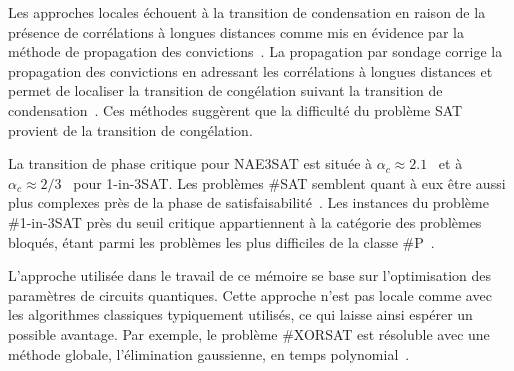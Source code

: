 Les approches locales échouent à la transition de condensation en raison de la présence de corrélations à longues distances comme mis en évidence par la méthode de propagation des convictions~\cite{mezardInformationPhysicsComputation2009}. La propagation par sondage corrige la propagation des convictions en adressant les corrélations à longues distances et permet de localiser la transition de congélation suivant la transition de condensation~\cite{mezardInformationPhysicsComputation2009}. Ces méthodes suggèrent que la difficulté du problème SAT provient de la transition de congélation. 

La transition de phase critique pour NAE3SAT est située à $\alpha_{c} \approx 2.1$~\cite{achlioptasPhaseTransition1ink2001} et à $\alpha_{c} \approx 2/3$~\cite{raymondPhaseDiagram1in32007} pour 1-in-3SAT. Les problèmes \#SAT semblent quant à eux être aussi plus complexes près de la phase de satisfaisabilité~\cite{dyerMarkovChainsIndependent2000, barthelClusteringAnalysisGroundstate2004}. Les instances du problème \#1-in-3SAT près du seuil critique appartiennent à la catégorie des problèmes bloqués, étant parmi les problèmes les plus difficiles de la classe \textsf{\#P}~\cite{zdeborovaStatisticalPhysicsHard2008}.

L'approche utilisée dans le travail de ce mémoire se base sur l'optimisation des paramètres de circuits quantiques. Cette approche n'est pas locale comme avec les algorithmes classiques typiquement utilisés, ce qui laisse ainsi espérer un possible avantage. Par exemple, le problème \#XORSAT est résoluble avec une méthode globale, l'élimination gaussienne, en temps polynomial~\cite{mooreNatureComputation2011}.
